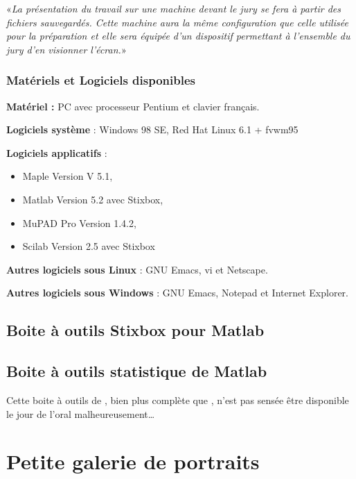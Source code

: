 {{«\emph{La présentation du travail sur une machine devant le jury se fera à
  partir des fichiers sauvegardés. Cette machine aura la même configuration
  que celle utilisée pour la préparation et elle sera équipée d'un dispositif
  permettant à l'ensemble du jury d'en visionner l'écran.}»

\subsection{Matériels et Logiciels disponibles}

\textbf{Matériel :} PC avec processeur Pentium et clavier français.

\textbf{Logiciels système} : Windows 98 SE, Red Hat Linux 6.1 + fvwm95

\textbf{Logiciels applicatifs} :
\begin{itemize}
\item Maple Version V 5.1,
\item Matlab Version 5.2 avec Stixbox,
\item MuPAD Pro Version 1.4.2,
\item Scilab Version 2.5 avec Stixbox
\end{itemize}

\textbf{Autres logiciels sous Linux} : GNU Emacs, vi et Netscape.

\textbf{Autres logiciels sous Windows} : GNU Emacs, Notepad et Internet
Explorer.
 
%
\section{Boite à outils Stixbox pour Matlab}\label{se:stixbox-cmd}
%



%
\section{Boite à outils statistique de Matlab}\label{se:stats-toolbox}
%

Cette boite à outils de \ML, bien plus complète que \SB, n'est pas sensée être
disponible le jour de l'oral malheureusement\ldots




%
\chapter{Petite galerie de portraits}
%

}}
